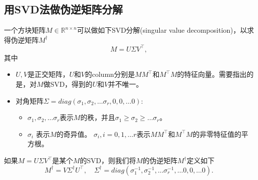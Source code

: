 \begin{subappendices}
\subsection{用SVD法做伪逆矩阵分解}
\label{sec:simple-pseudo-svd}
一个方块矩阵$M \in \mathbb{R}^{n \times n}$可以做如下SVD分解(singular value decomposition)，以求得伪逆矩阵$M^{\dagger}$
\begin{equation*}
  M = U \Sigma V^{\top},
\end{equation*}
其中
\begin{itemize}
  \item $U, V$是正交矩阵，$U$和$V$的column分别是$MM^{\top}$和$M^{\top}M$的特征向量。需要指出的是，对$M$做SVD，得到的$U$和$V$并不唯一。
  \item 对角矩阵$\Sigma = diag (\sigma_1, \sigma_2, \ldots \sigma_r, 0, 0,\ldots 0)$:
  \begin{itemize}
    \item $\sigma_{1}, \sigma_2, \ldots \sigma_r$表示$M$的秩，并且$\sigma_1 \ge \sigma_2 \ge \ldots \sigma_r$。
    \item $\sigma_i$ 表示$M$的奇异值。 $\sigma_i, i=0,1, \ldots r$表示$MM^{\top}$和$M^{\top}M$的非零特征值的平方根。
  \end{itemize}
\end{itemize}

如果$M = U \Sigma V^{\top}$是某个$M$的SVD，则我们将$M$的伪逆矩阵$M^{\dagger}$定义如下
\begin{equation}
  M^{\dagger} = V \Sigma^{\dagger} U^{\top}, \quad \Sigma^{\dagger} = diag \left(\sigma_1^{-1}, \sigma_2^{-1}, \ldots \sigma_r^{-1}, \ldots 0, 0, \ldots 0 \right).
\end{equation}


\end{subappendices}

